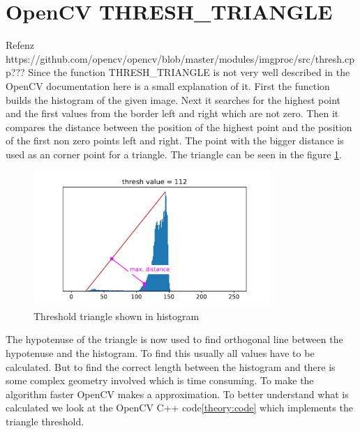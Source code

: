 \newpage
\section{OpenCV THRESH\_TRIANGLE }
Refenz https://github.com/opencv/opencv/blob/master/modules/imgproc/src/thresh.cpp???
Since the function THRESH\_TRIANGLE is not very well described in the OpenCV documentation here is a small explanation of it. First the function builds the histogram of the given image. Next it searches for the highest point and the first values from the border left and right which are not zero. Then it compares the distance between the position of the highest point and the position of the first non zero points left and right. The point with the bigger distance is used as an corner point for a triangle. The triangle can be seen in the figure \ref{theory:triangle}.

\begin{figure}[ht]
	\centering
	\includegraphics[width=0.8\textwidth]{2-theory/threshold/triangle.pdf}
	\caption{Threshold triangle shown in histogram\label{theory:triangle}}
\end{figure} 
The hypotenuse of the triangle is now used to find orthogonal line between the hypotenuse and the histogram. To find this usually all values have to be calculated. But to find the correct length between the histogram and there is some complex geometry involved which is time consuming. To make the algorithm faster OpenCV makes a approximation. To better understand what is calculated we look at the OpenCV C++ code\ref{theory:code} which implements the triangle threshold. 


\lstset{style=mystyle}


